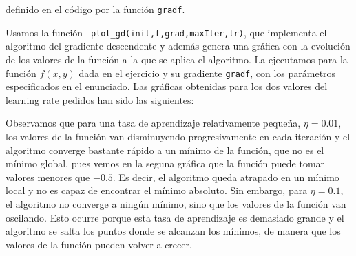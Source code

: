 \documentclass[a4]{article}
\begin{document}
definido en el código por la función \lstinline|gradf|.

Usamos la función \lstinline| plot_gd(init,f,grad,maxIter,lr)|, que implementa el algoritmo del gradiente descendente y además genera una gráfica con la evolución de los valores de la función a la que se aplica el algoritmo. La ejecutamos para la función $f(x,y)$ dada en el ejercicio y su gradiente \lstinline|gradf|, con los parámetros especificados en el enunciado. Las gráficas obtenidas para los dos valores del learning rate pedidos han sido las siguientes:

\begin{figure}[H]
    \centering    
    \caption{}
    \label{fig:comp-eta}
\end{figure}

Observamos que para una tasa de aprendizaje relativamente pequeña, $\eta=0.01$, los valores de la función van disminuyendo progresivamente en cada iteración y el algoritmo converge bastante rápido a un mínimo de la función, que no es el mínimo global, pues vemos en la seguna gráfica que la función puede tomar valores menores que $-0.5$. Es decir, el algoritmo queda atrapado en un mínimo local y no es capaz de encontrar el mínimo absoluto. Sin embargo, para $\eta=0.1$, el algoritmo no converge a ningún mínimo, sino que los valores de la función van oscilando. Esto ocurre porque esta tasa de aprendizaje es demasiado grande y el algoritmo se salta los puntos donde se alcanzan los mínimos, de manera que los valores de la función pueden volver a crecer.
\end{document}
